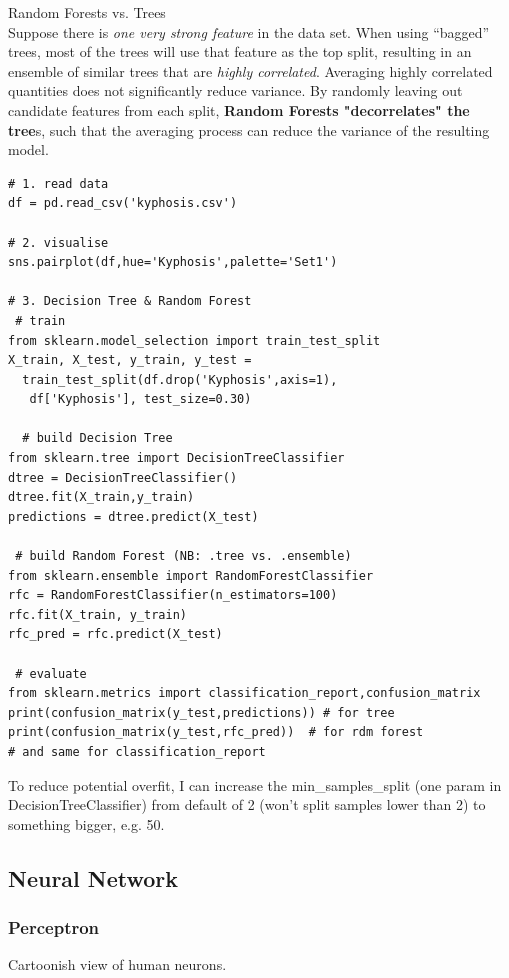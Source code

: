 \documentclass[11pt]{article}
\begin{document}
Random Forests vs. Trees \\
Suppose there is \textit{one very strong feature} in the data set. When using “bagged” trees, most of the trees will use that feature as the top split, resulting in an ensemble of similar trees that are \textit{highly correlated}. Averaging highly correlated quantities does not significantly reduce variance. By randomly leaving out candidate features from each split, \textbf{Random Forests "decorrelates" the tree}s, such that the averaging process can reduce the variance of the resulting model.

\begin{lstlisting}
# 1. read data
df = pd.read_csv('kyphosis.csv')

# 2. visualise 
sns.pairplot(df,hue='Kyphosis',palette='Set1')

# 3. Decision Tree & Random Forest
 # train
from sklearn.model_selection import train_test_split
X_train, X_test, y_train, y_test = 
  train_test_split(df.drop('Kyphosis',axis=1),
   df['Kyphosis'], test_size=0.30)
  
  # build Decision Tree
from sklearn.tree import DecisionTreeClassifier
dtree = DecisionTreeClassifier()
dtree.fit(X_train,y_train)
predictions = dtree.predict(X_test)

 # build Random Forest (NB: .tree vs. .ensemble)
from sklearn.ensemble import RandomForestClassifier
rfc = RandomForestClassifier(n_estimators=100)
rfc.fit(X_train, y_train)
rfc_pred = rfc.predict(X_test)

 # evaluate
from sklearn.metrics import classification_report,confusion_matrix
print(confusion_matrix(y_test,predictions)) # for tree
print(confusion_matrix(y_test,rfc_pred))  # for rdm forest
# and same for classification_report
\end{lstlisting}

To reduce potential overfit, I can increase the min\_samples\_split (one param in DecisionTreeClassifier) from default of 2 (won't split samples lower than 2) to something bigger, e.g. 50.

\subsection{Neural Network}

\subsubsection*{Perceptron}
Cartoonish view of human neurons.
\end{document}
